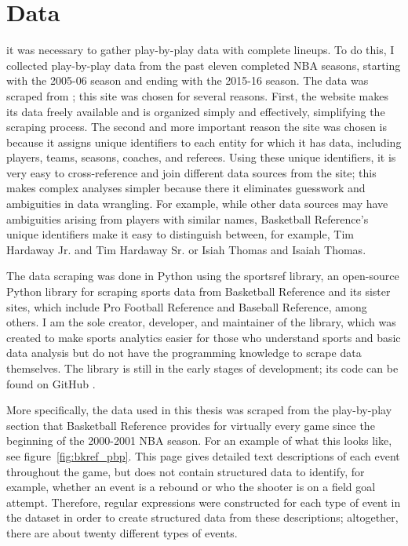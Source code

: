 
\chapter{Data} \label{ch:data}

 it was necessary to gather
play-by-play data with complete lineups. To do this, I collected play-by-play data
from the past eleven completed NBA seasons, starting with the 2005-06 season and
ending with the 2015-16 season. The data was scraped from \citet{BKRef}; this site
was chosen for several reasons. First, the website makes its data freely available
and is organized simply and effectively, simplifying the scraping process.  The
second and more important reason the site was chosen is because it assigns unique
identifiers to each entity for which it has data, including players, teams, seasons,
coaches, and referees. Using these unique identifiers, it is very easy to
cross-reference and join different data sources from the site; this makes complex
analyses simpler because there it eliminates guesswork and ambiguities in data
wrangling. For example, while other data sources may have ambiguities arising from
players with similar names, Basketball Reference's unique identifiers make it easy
to distinguish between, for example, Tim Hardaway Jr. and Tim Hardaway Sr. or Isiah
Thomas and Isaiah Thomas.

The data scraping was done in Python using the sportsref library, an open-source
Python library for scraping sports data from Basketball Reference and its sister
sites, which include Pro Football Reference and Baseball Reference, among others. I
am the sole creator, developer, and maintainer of the library, which was
created to make sports analytics easier for those who understand sports and basic
data analysis but do not have the programming knowledge to scrape data themselves.
The library is still in the early stages of development; its code can be found on
GitHub \cite{Sportsref}.

More specifically, the data used in this thesis was scraped from the play-by-play
section that Basketball Reference provides for virtually every game since the
beginning of the 2000-2001 NBA season. For an example of what this looks like, see
figure~\ref{fig:bkref_pbp}. This page gives detailed text descriptions of each event
throughout the game, but does not contain structured data to identify, for example,
whether an event is a rebound or who the shooter is on a field goal attempt.
Therefore, regular expressions were constructed for each type of event in the
dataset in order to create structured data from these descriptions; altogether,
there are about twenty different types of events.

